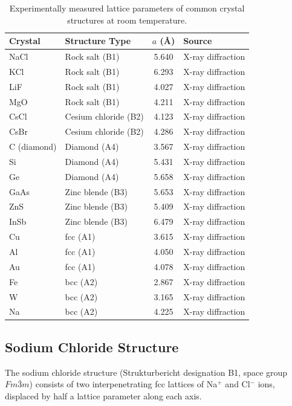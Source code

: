 \begin{table}[H]
\centering
\caption{Experimentally measured lattice parameters of common crystal structures at room temperature.}
\label{tab:structures}
\begin{tabular}{@{}llS[table-format=1.3]l@{}}
\toprule
Crystal & Structure Type & {$a$ (\AA{})} & Source \\
\midrule
NaCl   & Rock salt (B1)      & 5.640 & X-ray diffraction \\
KCl    & Rock salt (B1)      & 6.293 & X-ray diffraction \\
LiF    & Rock salt (B1)      & 4.027 & X-ray diffraction \\
MgO    & Rock salt (B1)      & 4.211 & X-ray diffraction \\
CsCl   & Cesium chloride (B2)& 4.123 & X-ray diffraction \\
CsBr   & Cesium chloride (B2)& 4.286 & X-ray diffraction \\
C (diamond) & Diamond (A4)   & 3.567 & X-ray diffraction \\
Si     & Diamond (A4)        & 5.431 & X-ray diffraction \\
Ge     & Diamond (A4)        & 5.658 & X-ray diffraction \\
GaAs   & Zinc blende (B3)    & 5.653 & X-ray diffraction \\
ZnS    & Zinc blende (B3)    & 5.409 & X-ray diffraction \\
InSb   & Zinc blende (B3)    & 6.479 & X-ray diffraction \\
Cu     & fcc (A1)            & 3.615 & X-ray diffraction \\
Al     & fcc (A1)            & 4.050 & X-ray diffraction \\
Au     & fcc (A1)            & 4.078 & X-ray diffraction \\
Fe     & bcc (A2)            & 2.867 & X-ray diffraction \\
W      & bcc (A2)            & 3.165 & X-ray diffraction \\
Na     & bcc (A2)            & 4.225 & X-ray diffraction \\
\bottomrule
\end{tabular}
\end{table}


\subsection{Sodium Chloride Structure}

The sodium chloride structure (Strukturbericht designation B1, space group $Fm\bar{3}m$) consists of two interpenetrating fcc lattices of Na$^+$ and Cl$^-$ ions, displaced by half a lattice parameter along each axis.

